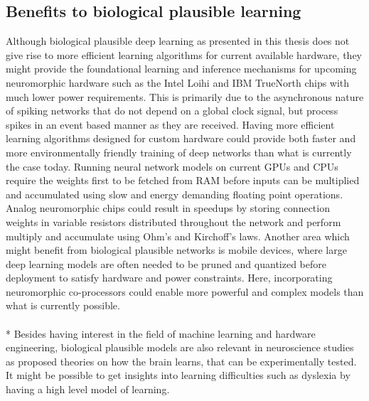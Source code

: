 \documentclass[a4paper,11pt]{article}
\begin{document}
\subsection{Benefits to biological plausible learning}
Although biological plausible deep learning as presented in this thesis does not give rise to more efficient learning algorithms for current available hardware, they might provide the foundational learning and inference mechanisms for upcoming neuromorphic hardware such as the Intel Loihi and IBM TrueNorth chips with much lower power requirements. This is primarily due to the asynchronous nature of spiking networks that do not depend on a global clock signal, but process spikes in an event based manner as they are received. Having more efficient learning algorithms designed for custom hardware could provide both faster and more environmentally friendly training of deep networks than what is currently the case today.
Running neural network models on current GPUs and CPUs require the weights first to be fetched from RAM before inputs can be multiplied and accumulated using slow and energy demanding floating point operations. Analog neuromorphic chips could result in speedups by storing connection weights in variable resistors distributed throughout the network and perform multiply and accumulate using Ohm's and Kirchoff's laws. 
Another area which might benefit from biological plausible networks is mobile devices, where large deep learning models are often needed to be pruned and quantized before deployment to satisfy hardware and power constraints. Here, incorporating neuromorphic co-processors could enable more powerful and complex models than what is currently possible.\\
\\*
Besides having interest in the field of machine learning and hardware engineering, biological plausible models are also relevant in neuroscience studies as proposed theories on how the brain learns, that can be experimentally tested. It might be possible to get insights into learning difficulties such as dyslexia by having a high level model of learning.

\newpage
\end{document}
